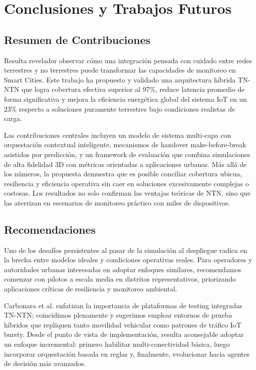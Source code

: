 \section{Conclusiones y Trabajos Futuros}

\subsection{Resumen de Contribuciones}

Resulta revelador observar cómo una integración pensada con cuidado entre redes terrestres y no terrestres puede transformar las capacidades de monitoreo en Smart Cities. Este trabajo ha propuesto y validado una arquitectura híbrida TN-NTN que logra cobertura efectiva superior al 97\%, reduce latencia promedio de forma significativa y mejora la eficiencia energética global del sistema IoT en un 23\% respecto a soluciones puramente terrestres bajo condiciones realistas de carga.

Las contribuciones centrales incluyen un modelo de sistema multi-capa con orquestación contextual inteligente, mecanismos de handover make-before-break asistidos por predicción, y un framework de evaluación que combina simulaciones de alta fidelidad 3D con métricas orientadas a aplicaciones urbanas. Más allá de los números, la propuesta demuestra que es posible conciliar cobertura ubicua, resiliencia y eficiencia operativa sin caer en soluciones excesivamente complejas o costosas. Los resultados no solo confirman las ventajas teóricas de NTN, sino que las aterrizan en escenarios de monitoreo práctico con miles de dispositivos.

\subsection{Recomendaciones}

Uno de los desafíos persistentes al pasar de la simulación al despliegue radica en la brecha entre modelos ideales y condiciones operativas reales. Para operadores y autoridades urbanas interesadas en adoptar enfoques similares, recomendamos comenzar con pilotos a escala media en distritos representativos, priorizando aplicaciones críticas de resiliencia y monitoreo ambiental.

Carbonara et al. \cite{Carbonara2025} enfatizan la importancia de plataformas de testing integradas TN-NTN; coincidimos plenamente y sugerimos emplear entornos de prueba híbridos que repliquen tanto movilidad vehicular como patrones de tráfico IoT bursty. Desde el punto de vista de implementación, resulta aconsejable adoptar un enfoque incremental: primero habilitar multi-conectividad básica, luego incorporar orquestación basada en reglas y, finalmente, evolucionar hacia agentes de decisión más avanzados. 

